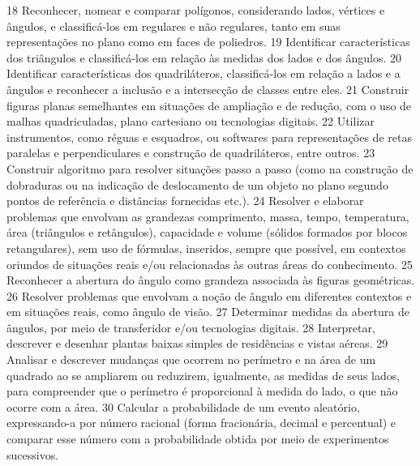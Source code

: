 {{{{{						}
						{18}{%
							Reconhecer, nomear e comparar polígonos, considerando lados, vértices e
							ângulos, e classificá-los em regulares e não regulares, tanto em suas representações no plano
							como em faces de poliedros.
						}
						{19}{%
							Identificar características dos triângulos e classificá-los em relação às medidas dos
							lados e dos ângulos.
						}
						{20}{%
							Identificar características dos quadriláteros, classificá-los em relação a lados e a
							ângulos e reconhecer a inclusão e a intersecção de classes entre eles.
						}
						{21}{%
							Construir figuras planas semelhantes em situações de ampliação e de redução,
							com o uso de malhas quadriculadas, plano cartesiano ou tecnologias digitais.
						}
						{22}{%
							Utilizar instrumentos, como réguas e esquadros, ou softwares para representações
							de retas paralelas e perpendiculares e construção de quadriláteros, entre outros.
						}
						{23}{%
							Construir algoritmo para resolver situações passo a passo (como na construção
							de dobraduras ou na indicação de deslocamento de um objeto no plano segundo pontos de
							referência e distâncias fornecidas etc.).
						}
						{24}{%
							Resolver e elaborar problemas que envolvam as grandezas comprimento, massa,
							tempo, temperatura, área (triângulos e retângulos), capacidade e volume (sólidos formados
							por blocos retangulares), sem uso de fórmulas, inseridos, sempre que possível, em contextos
							oriundos de situações reais e/ou relacionadas às outras áreas do conhecimento.
						}
						{25}{%
							Reconhecer a abertura do ângulo como grandeza associada às figuras geométricas.
						}
						{26}{%
							Resolver problemas que envolvam a noção de ângulo em diferentes contextos e
							em situações reais, como ângulo de visão.
						}
						{27}{%
							Determinar medidas da abertura de ângulos, por meio de transferidor e/ou
							tecnologias digitais.
						}
						{28}{%
							Interpretar, descrever e desenhar plantas baixas simples de residências e vistas aéreas.
						}
						{29}{%
							Analisar e descrever mudanças que ocorrem no perímetro e na área de um
							quadrado ao se ampliarem ou reduzirem, igualmente, as medidas de seus lados, para
							compreender que o perímetro é proporcional à medida do lado, o que não ocorre com a área.
						}
						{30}{%
							Calcular a probabilidade de um evento aleatório, expressando-a por número
							racional (forma fracionária, decimal e percentual) e comparar esse número com a probabilidade
							obtida por meio de experimentos sucessivos.
}}}}}
